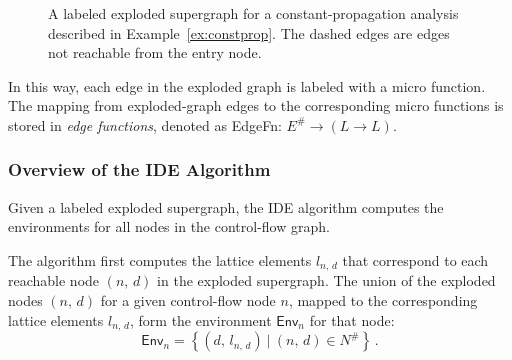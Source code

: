 {\begin{mdelete}
\begin{figure}
  \caption[A labeled exploded supergraph for a constant-propagation analysis described in Example~\ref{ex:constprop}]{A labeled exploded supergraph for a constant-propagation analysis described in Example~\ref{ex:constprop}. The dashed edges are edges not reachable from the entry node.}%
  \label{fig:constprop}%
  \end{figure}
\end{mdelete}
}
  
In this way, each edge in the exploded graph is labeled with a micro function. The mapping from exploded-graph edges to the corresponding micro functions is stored in \textit{edge functions},  denoted as \textsf{EdgeFn}$:\,E^\#\to(L\to L)$.

\subsubsection{Overview of the IDE Algorithm}\label{sec:ideoverview}
Given a labeled exploded supergraph, the IDE algorithm computes the environments for all nodes in the control-flow graph.

The algorithm first computes the lattice elements $l_{n,\,d}$ that correspond to each reachable node $(n,\,d)$ in the exploded supergraph. The union of the exploded nodes $(n,\,d)$ for a given control-flow node $n$, mapped to the corresponding lattice elements $l_{n,\,d}$, form the environment $\textsf{Env}_n$  for that node:
\begin{equation}
  \textsf{Env}_n=\left\{(d,\,l_{n,\,d})\ |\ (n,\,d)\in N^\#\right\}\,.
\end{equation}

